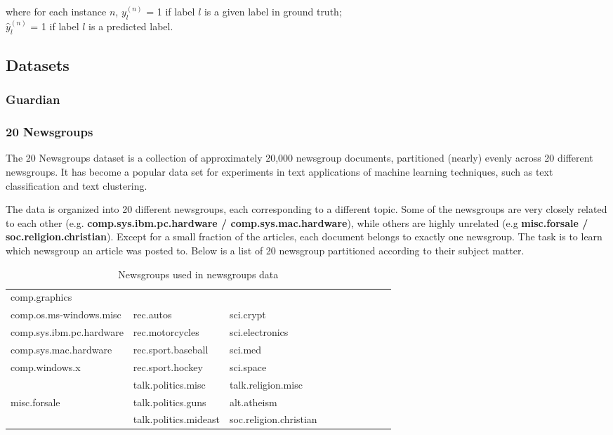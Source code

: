 \noindent where for each instance $n$, $y^{(n)}_{l}$ = 1 if label $l$ is a given label in ground truth; \\
$\hat{y}^{(n)}_{l}$ = 1 if label $l$ is a predicted label.
\newpage
\subsection{Datasets}

\subsubsection{Guardian}

\subsubsection{20 Newsgroups}

The 20 Newsgroups dataset is a collection of approximately 20,000 newsgroup documents, partitioned (nearly) evenly across 20 different newsgroups. It has become a popular data set for experiments in text applications of machine learning techniques, such as text classification and text clustering.

The data is organized into 20 different newsgroups, each corresponding to a different topic. Some of the newsgroups are very closely related to each other (e.g.\textbf{ comp.sys.ibm.pc.hardware / comp.sys.mac.hardware}), while others are highly unrelated (e.g \textbf{misc.forsale / soc.religion.christian}). Except for a small fraction of the articles, each document belongs to exactly one newsgroup. The task is to learn which newsgroup an article was posted to. Below is a list of 20 newsgroup partitioned according to their subject matter.\\

\begin{table}[htbp]
\begin{tabular}{|l|l|l|lllllll}
\cline{1-3}
comp.graphics            &                       &                        &  &  &  &  &  &  &  \\
comp.os.ms-windows.misc  & rec.autos             & sci.crypt              &  &  &  &  &  &  &  \\
comp.sys.ibm.pc.hardware & rec.motorcycles       & sci.electronics        &  &  &  &  &  &  &  \\
comp.sys.mac.hardware    & rec.sport.baseball    & sci.med                &  &  &  &  &  &  &  \\
comp.windows.x           & rec.sport.hockey      & sci.space              &  &  &  &  &  &  &  \\ \cline{1-3}
                         & talk.politics.misc    & talk.religion.misc     &  &  &  &  &  &  &  \\
misc.forsale             & talk.politics.guns    & alt.atheism            &  &  &  &  &  &  &  \\
                         & talk.politics.mideast & soc.religion.christian &  &  &  &  &  &  &  \\ \cline{1-3}
\end{tabular}
\caption{\label{tab:widgets}Newsgroups used in newsgroups data}
\end{table}

